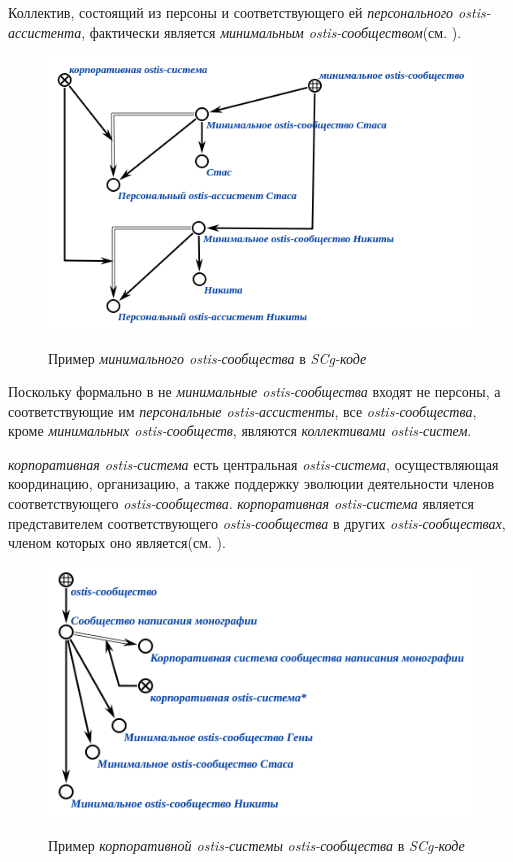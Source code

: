 Коллектив, состоящий из персоны и соответствующего ей \textit{персонального ostis-ассистента}, фактически является \textit{минимальным ostis-сообществом}(см. ).

\begin{figure}[H]
    \caption{Пример \textit{минимального ostis-сообщества} в \textit{SCg-коде}}
    \includegraphics[scale=0.8]{author/part7/chapter_ecosystem/figures/corporate_ostis_system_example_ru.png}
    \label{fig:ostis_corporate}
\end{figure}

Поскольку формально в не \textit{минимальные ostis-сообщества} входят не персоны, а соответствующие им \textit{персональные ostis-ассистенты}, все \textit{ostis-сообщества}, кроме \textit{минимальных ostis-сообществ}, являются \textit{коллективами ostis-систем}.

\textit{корпоративная ostis-система} есть центральная \textit{ostis-система}, осуществляющая координацию, организацию, а также поддержку эволюции деятельности членов соответствующего \textit{ostis-сообщества}. 
\textit{корпоративная ostis-система} является представителем соответствующего \textit{ostis-сообщества} в других \textit{ostis-сообществах}, членом которых оно является(см. ).

\begin{figure}[H]
    \caption{Пример \textit{корпоративной ostis-системы} \textit{ostis-сообщества} в \textit{SCg-коде}}
    \includegraphics[scale=0.8]{author/part7/chapter_ecosystem/figures/ostis-system collectivity_example_ru.png}
    \label{fig:ostis_community}
\end{figure}

